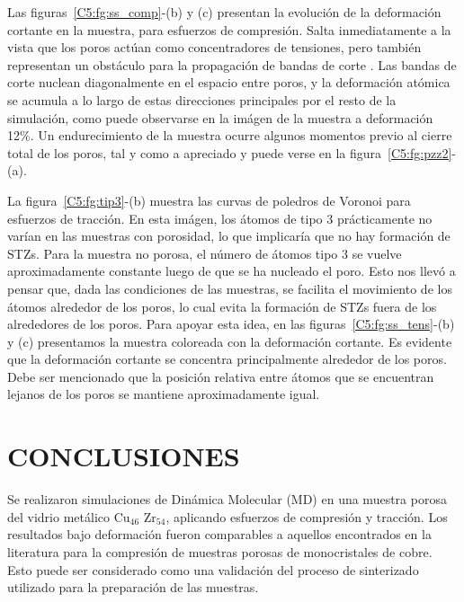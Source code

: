 Las figuras~\ref{C5:fg:ss_comp}-(b) y (c) presentan la evolución de la deformación cortante en la muestra, para esfuerzos de compresión.
Salta inmediatamente a la vista que los poros actúan como concentradores de tensiones, pero también representan un obstáculo para la
propagación de bandas de corte \citep{wang10}. Las bandas de corte nuclean diagonalmente en el espacio entre poros, y la deformación atómica
se acumula a lo largo de estas direcciones principales por el resto de la simulación, como puede observarse en la imágen de la muestra a 
deformación 12\%. Un endurecimiento de la muestra ocurre algunos momentos previo al cierre total de los poros, tal y como a apreciado
\cite{yuan14} y puede verse en la figura~\ref{C5:fg:pzz2}-(a).

La figura~\ref{C5:fg:tip3}-(b) muestra las curvas de poledros de Voronoi para esfuerzos de tracción. En esta imágen, los átomos de tipo 3
prácticamente no varían en las muestras con porosidad, lo que implicaría que no hay formación de STZs.
Para la muestra no porosa, el número de átomos tipo 3 se vuelve aproximadamente constante luego de que se ha nucleado el poro. Esto
nos llevó a pensar que, dada las condiciones de las muestras, se facilita el movimiento de los átomos alrededor de los poros, lo cual evita
la formación de STZs fuera de los alrededores de los poros. Para apoyar esta idea, en las figuras~\ref{C5:fg:ss_tens}-(b) y (c) presentamos
la muestra coloreada con la deformación cortante. Es evidente que la deformación cortante se concentra principalmente alrededor
de los poros. Debe ser mencionado que la posición relativa entre átomos que se encuentran lejanos de los poros se mantiene aproximadamente igual.



\section{CONCLUSIONES}
\label{S5_4}

Se realizaron simulaciones de Dinámica Molecular (MD) en una muestra porosa del vidrio metálico Cu$_{46}$ Zr$_{54}$, aplicando esfuerzos
de compresión y tracción. Los resultados bajo deformación fueron comparables a aquellos encontrados en la literatura \citep{yuan14} para
la compresión de muestras porosas de monocristales de cobre. Esto puede ser considerado como una validación del proceso de sinterizado 
utilizado para la preparación de las muestras.

